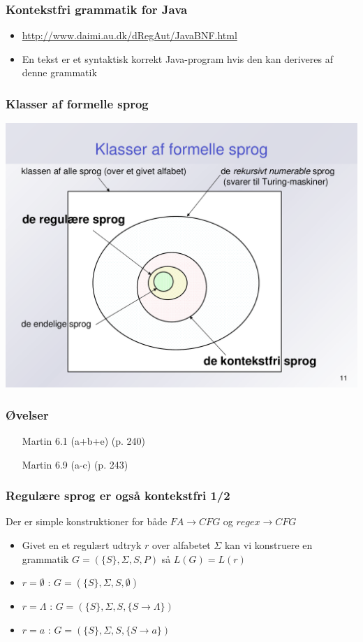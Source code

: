 \documentclass{beamer}
\begin{document}
\begin{frame}
\frametitle{Kontekstfri grammatik for Java}
\begin{itemize}
\item \url{http://www.daimi.au.dk/dRegAut/JavaBNF.html}
\item En tekst er et syntaktisk korrekt Java-program  
hvis den kan deriveres af denne grammatik
\end{itemize}
\end{frame}

\begin{frame}
\frametitle{Klasser af formelle sprog}
\includegraphics[scale=.4]{images/klasser}
\end{frame}

\begin{frame}
  \frametitle{Øvelser}
  \begin{itemize}[<+->]
  \item  [Martin] 6.1 (a+b+e) (p. 240)
  \item [Martin] 6.9 (a-c) (p. 243)
  \end{itemize}
\end{frame}

\begin{frame}
\frametitle{Regulære sprog er også kontekstfri 1/2}
Der er simple konstruktioner for både $FA\rightarrow CFG$ og $regex \rightarrow CFG$
\begin{itemize}[<+->]
\item Givet en et regulært udtryk $r$ over alfabetet $\Sigma$ kan vi
konstruere en grammatik $G=(\{S\},\Sigma, S, P)$ så $L(G) = L(r)$
\item $r = \emptyset$ : $G=(\{S\},\Sigma, S, \emptyset)$
\item $r = \Lambda$ : $G=(\{S\},\Sigma, S, \{S\rightarrow \Lambda\})$
\item $r = a$ : $G=(\{S\},\Sigma, S, \{S\rightarrow a\})$
\end{itemize}
\end{frame}
\end{document}
